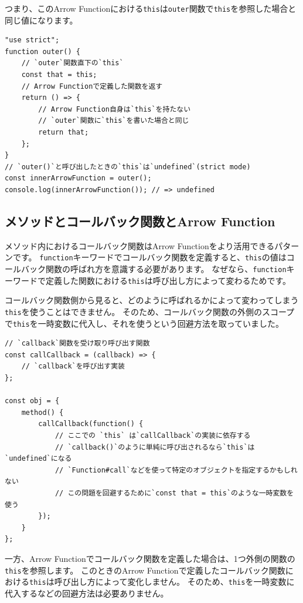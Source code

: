 つまり、このArrow
Functionにおける\texttt{this}は\texttt{outer}関数で\texttt{this}を参照した場合と同じ値になります。

\begin{lstlisting}
"use strict";
function outer() {
    // `outer`関数直下の`this`
    const that = this;
    // Arrow Functionで定義した関数を返す
    return () => {
        // Arrow Function自身は`this`を持たない
        // `outer`関数に`this`を書いた場合と同じ
        return that;
    };
}
// `outer()`と呼び出したときの`this`は`undefined`(strict mode)
const innerArrowFunction = outer();
console.log(innerArrowFunction()); // => undefined
\end{lstlisting}

\hypertarget{method-callback-arrow-function}{%
\subsection{メソッドとコールバック関数とArrow
Function}\label{method-callback-arrow-function}}

メソッド内におけるコールバック関数はArrow
Functionをより活用できるパターンです。
\texttt{function}キーワードでコールバック関数を定義すると、\texttt{this}の値はコールバック関数の呼ばれ方を意識する必要があります。
なぜなら、\texttt{function}キーワードで定義した関数における\texttt{this}は呼び出し方によって変わるためです。

コールバック関数側から見ると、どのように呼ばれるかによって変わってしまう\texttt{this}を使うことはできません。
そのため、コールバック関数の外側のスコープで\texttt{this}を一時変数に代入し、それを使うという回避方法を取っていました。

\begin{lstlisting}
// `callback`関数を受け取り呼び出す関数
const callCallback = (callback) => {
    // `callback`を呼び出す実装
};

const obj = {
    method() {
        callCallback(function() {
            // ここでの `this` は`callCallback`の実装に依存する
            // `callback()`のように単純に呼び出されるなら`this`は`undefined`になる
            // `Function#call`などを使って特定のオブジェクトを指定するかもしれない
            // この問題を回避するために`const that = this`のような一時変数を使う
        });
    }
};
\end{lstlisting}

一方、Arrow
Functionでコールバック関数を定義した場合は、1つ外側の関数の\texttt{this}を参照します。
このときのArrow
Functionで定義したコールバック関数における\texttt{this}は呼び出し方によって変化しません。
そのため、\texttt{this}を一時変数に代入するなどの回避方法は必要ありません。

